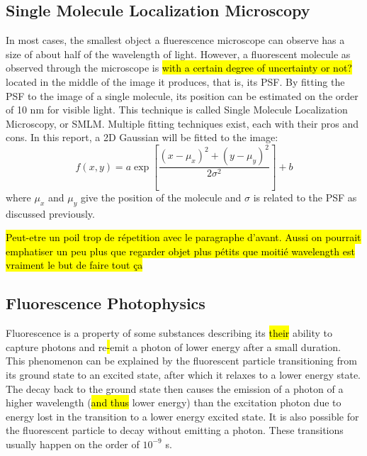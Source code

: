\subsection{Single Molecule Localization Microscopy}
In most cases, the smallest object a fluerescence microscope can observe has a size of about half of the wavelength of light. However, a fluorescent molecule as observed through the microscope is \hl{with a certain degree of uncertainty or not?} located in the middle of the image it produces, that is, its PSF. By fitting the PSF to the image of a single molecule, its position can be estimated on the order of 10 nm for visible light. This technique is called Single Molecule Localization Microscopy, or SMLM. Multiple fitting techniques exist, each with their pros and cons. In this report, a 2D Gaussian will be fitted to the image:
\begin{equation}
    f(x, y) = a \exp \left[ \frac{(x-\mu_x)^2 + (y-\mu_y)^2}{2 \sigma^2} \right] + b
\end{equation}
where $\mu_x$ and $\mu_y$ give the position of the molecule and $\sigma$ is related to the PSF as discussed previously.

\hl{Peut-etre un poil trop de répetition avec le paragraphe d'avant. Aussi on pourrait emphatiser un peu plus que regarder objet plus pétits que moitié wavelength est vraiment le but de faire tout ça}

\subsection{Fluorescence Photophysics}
Fluorescence is a property of some substances describing its \hl{their} ability to capture photons and re\hl{-}emit a photon of lower energy after a small duration. This phenomenon can be explained by the fluorescent particle transitioning from its ground state to an excited state, after which it relaxes to a lower energy state. The decay back to the ground state then causes the emission of a photon of a higher wavelength (\hl{and thus} lower energy) than the excitation photon due to energy lost in the transition to a lower energy excited state. It is also possible for the fluorescent particle to decay without emitting a photon. These transitions usually happen on the order of $10^{-9}$ s.


